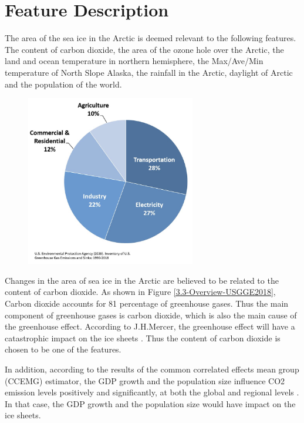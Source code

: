 \section{Feature Description} %

The area of the sea ice in the Arctic is deemed relevant to the following features. The content of carbon dioxide, the area of the ozone hole over the Arctic, the land and ocean temperature in northern hemisphere, the Max/Ave/Min temperature of North Slope Alaska, the rainfall in the Arctic, daylight of Arctic and the population of the world.

\begin{figure}[t]
\center
\includegraphics[width = 0.66\textwidth]{Figure/3.3-Overview-USGGE2018.jpg}
\end{figure}

Changes in the area of sea ice in the Arctic are believed to be related to the content of carbon dioxide. As shown in Figure \ref{3.3-Overview-USGGE2018}, Carbon dioxide accounts for 81 percentage of greenhouse gases. Thus the main component of greenhouse gases is carbon dioxide, which is also the main cause of the greenhouse effect. According to J.H.Mercer, the greenhouse effect will have a catastrophic impact on the ice sheets \cite{mercer1978west}. Thus the content of carbon dioxide is chosen to be one of the features.

In addition, according to the results of the common correlated effects mean group (CCEMG) estimator, the GDP growth and the population size influence CO2 emission levels positively and significantly, at both the global and regional levels \cite{DONG2018180}. In that case, the GDP growth and the population size would have impact on the ice sheets.

